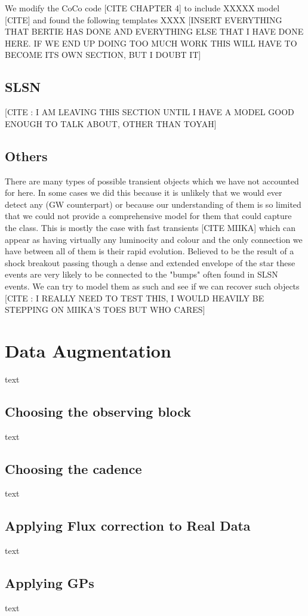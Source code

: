 We modify the CoCo code [CITE CHAPTER 4] to include XXXXX model [CITE] and found the following templates XXXX [INSERT EVERYTHING THAT BERTIE HAS DONE AND EVERYTHING ELSE THAT I HAVE DONE HERE. IF WE END UP DOING TOO MUCH WORK THIS WILL HAVE TO BECOME ITS OWN SECTION, BUT I DOUBT IT]

\subsection{SLSN}
[CITE : I AM LEAVING THIS SECTION UNTIL I HAVE A MODEL GOOD ENOUGH TO TALK ABOUT, OTHER THAN TOYAH]

\subsection{Others}
There are many types of possible transient objects which we have not accounted for here. In some cases we did this because it is unlikely that we would ever detect any (GW counterpart) or because our understanding of them is so limited that we could not provide a comprehensive model for them that could capture the class. This is mostly the case with fast transients [CITE MIIKA] which can appear as having virtually any luminocity and colour and the only connection we have between all of them is their rapid evolution. Believed to be the result of a shock breakout passing though a dense and extended envelope of the star these events are very likely to be connected to the "bumps" often found in SLSN events. We can try to model them as such and see if we can recover such objects [CITE : I REALLY NEED TO TEST THIS, I WOULD HEAVILY BE STEPPING ON MIIKA'S TOES BUT WHO CARES]

\section{Data Augmentation}
text
\subsection{Choosing the observing block}
text
\subsection{Choosing the cadence}
text
\subsection{Applying Flux correction to Real Data}
text
\subsection{Applying GPs}
text

